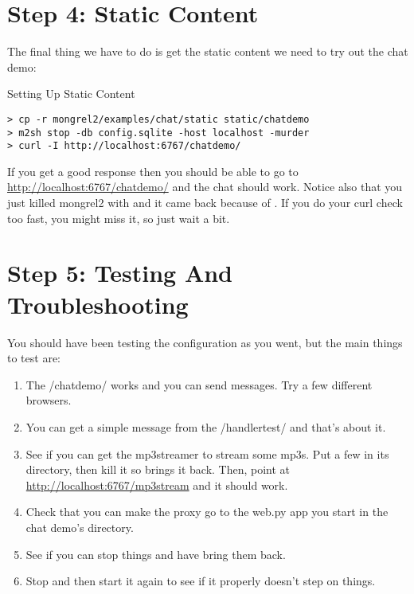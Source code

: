 \section{Step 4: Static Content}

The final thing we have to do is get the static content we need to try
out the chat demo:

\begin{code}{Setting Up Static Content}
\begin{Verbatim}
> cp -r mongrel2/examples/chat/static static/chatdemo
> m2sh stop -db config.sqlite -host localhost -murder
> curl -I http://localhost:6767/chatdemo/
\end{Verbatim}
\end{code}

If you get a good response then you should be able to go to
\url{http://localhost:6767/chatdemo/} and the chat should work.  Notice
also that you just killed mongrel2 with  and it came back
because of .  If you do your curl check too fast,
you might miss it, so just wait a bit.

\section{Step 5: Testing And Troubleshooting}

You should have been testing the configuration as you went, but the
main things to test are:

\begin{enumerate}
\item The /chatdemo/ works and you can send messages. Try a few different
    browsers.
\item You can get a simple message from the /handlertest/ and that's about it.
\item See if you can get the mp3streamer to stream some mp3s.  Put a few
    in its directory, then kill it so  brings it back.  Then,
    point  at \url{http://localhost:6767/mp3stream} and
    it should work.
\item Check that you can make the proxy go to the web.py app you start
    in the chat demo's directory.
\item See if you can stop things and have  bring them back.
\item Stop  and then start it again to see if it properly
    doesn't step on things.
\end{enumerate}

